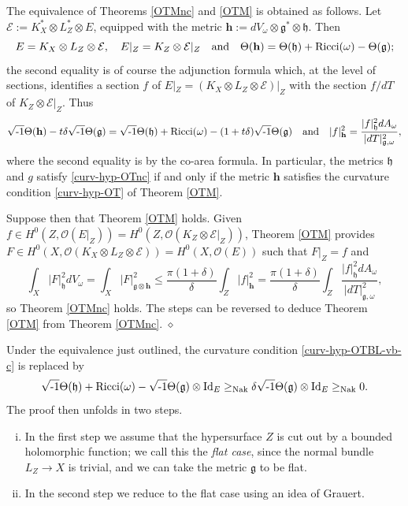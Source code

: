 \documentclass[12pt,hidelinks]{amsart}
\newcommand{\cE}{{\mathcal E}}
\newcommand{\cO}{{\mathcal O}}
\newcommand{\fg}{{\mathfrak g}}
\newcommand{\fh}{{\mathfrak h}}
\newcommand{\red}{\hfill $\diamond$}
\newcommand{\ii}{\sqrt{\text{\rm -}1}}
\newcommand{\tensor}{\otimes}
\begin{document}
\begin{s-rmk}
The equivalence of Theorems \ref{OTMnc} and \ref{OTM} is obtained as follows.  Let $\cE := K_X^* \tensor L_Z^* \tensor E$, equipped with the metric $\mathbf{h} := dV_{\omega}\tensor \fg^* \tensor \fh$.  Then 
\[
E = K_X \tensor L_Z \tensor \cE, \quad E|_Z= K_Z \tensor \cE|_Z \quad \text{and} \quad  \Theta (\mathbf{h}) = \Theta (\fh) + {\rm Ricci}(\omega)  - \Theta (\fg);
\]
the second equality is of course the adjunction formula which, at the level of sections, identifies a section $f$ of $E|_Z = (K_X \tensor L_Z \tensor \cE)|_Z$ with the section $f/dT$ of $K_Z \tensor \cE|_Z$.  Thus 
\[
\ii \Theta (\mathbf{h}) - t\delta \ii \Theta (\fg) = \ii \Theta (\fh) + {\rm Ricci}(\omega) - (1+t\delta)\ii \Theta (\fg) \quad \text{and} \quad |f|^2_{\mathbf{h}} = \frac{|f|^2 _{\fh}dA_{\omega}}{|dT|^2_{\fg, \omega}},
\]
where the second equality is by the co-area formula.  In particular, the metrics $\fh$ and $g$ satisfy \eqref{curv-hyp-OTnc} if and only if the metric $\mathbf{h}$ satisfies the curvature condition \eqref{curv-hyp-OT} of Theorem \ref{OTM}.

Suppose then that Theorem \ref{OTM} holds.  Given $f \in H^0(Z, \cO (E|_Z)) = H^0(Z, \cO (K_Z \tensor \cE|_Z))$, Theorem \ref{OTM} provides $F \in H^0(X, \cO (K_X \tensor L_Z \tensor \cE))=H^0(X, \cO (E))$ such that $F|_Z = f$ and 
\[
\int _X |F|^2_{\fh} dV_{\omega} = \int _X |F|^2_{\fg \tensor \mathbf{h}} \le \frac{\pi (1+\delta)}{\delta} \int _Z |f|^2 _{\mathbf{h}} = \frac{\pi (1+\delta)}{\delta} \int _Z \frac{|f|^2_{\fh} dA_{\omega}}{|dT|^2_{\fg,\omega}},
\]
so Theorem \ref{OTMnc} holds.  The steps can be reversed to deduce Theorem \ref{OTM} from Theorem \ref{OTMnc}.
\red
\end{s-rmk}

Under the equivalence just outlined, the curvature condition \eqref{curv-hyp-OTBL-vb-c} is replaced by 
\begin{equation}\label{curv-hyp-OTBL-vb}
\ii \Theta (\fh) + {\rm Ricci}(\omega) - \ii \Theta (\fg) \tensor {\rm Id}_E \ge_{{\rm Nak}} \delta \ii \Theta (\fg) \tensor {\rm Id}_E\ge_{{\rm Nak}} 0.
\end{equation}
The proof then unfolds in two steps.  
\begin{enumerate}[i.]
\item In the first step we assume that the hypersurface $Z$ is cut out by a bounded holomorphic function; we call this the \emph{flat case}, since the normal bundle $L_Z \to X$ is trivial, and we can take the metric $\fg$ to be flat.
\item In the second step we reduce to the flat case using an idea of Grauert.
\end{enumerate}
\end{document}
